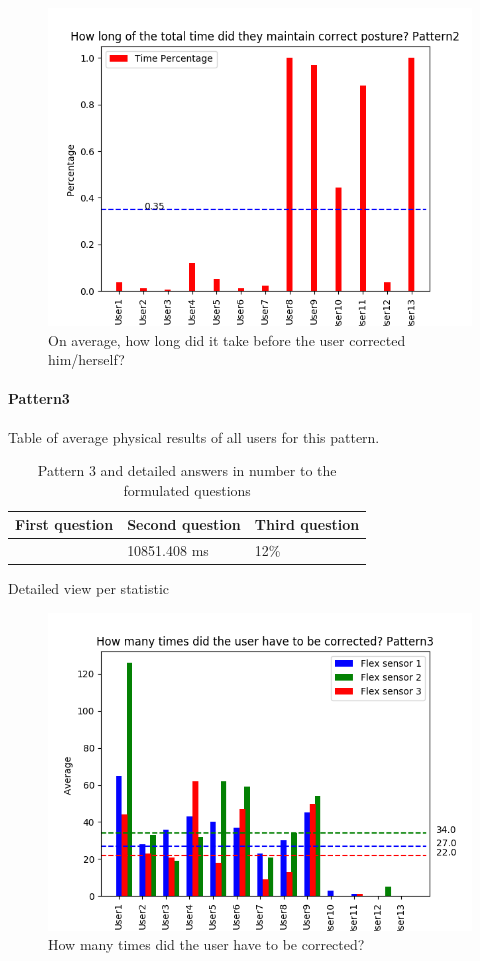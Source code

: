 \documentclass[sigconf]{acmart}
\begin{document}
\begin{figure}[h]
\centering
\includegraphics[width=1\columnwidth, scale=1]{p2_q3.png}
\caption{On average, how long did it take before the user corrected him/herself?}
\end{figure}


\paragraph {\textbf{Pattern3}}
Table of average physical results of all users for this pattern.\\
\begin{table}[htb]
\caption{Pattern 3 and detailed answers in number to the formulated questions}
\label{my-label}
\begin{tabular}{|l|l|l|}
\hline
\multicolumn{1}{|c|}{\textbf{First question}} & \multicolumn{1}{c|}{\textbf{Second question}} & \multicolumn{1}{c|}{\textbf{Third question}} \\ \hline
 			[27.0, 34.0, 22.0]				  & 10851.408 ms 								  &   	12\%  							      \\ \hline
\end{tabular}
\end{table}

Detailed view per statistic
\begin{figure}[ht]
\centering
\includegraphics[width=0.8\columnwidth, scale=1]{p3_q1.png}
\caption{How many times did the user have to be corrected?}
\end{figure}
\end{document}
